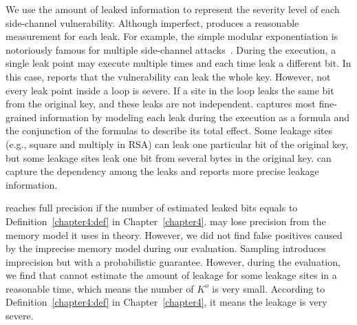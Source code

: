 We use the amount of leaked information to represent the severity level of
each side-channel vulnerability. Although imperfect, \tool{} produces a reasonable
measurement for each leak. For example, the simple modular exponentiation is
notoriously famous for multiple side-channel attacks~\cite{kocher1996timing}.
During the execution, a single leak point may execute multiple times
and each time leak a different bit. In this case, \tool{} reports that the
vulnerability can leak the whole key. However, not every leak point inside a
loop is severe. If a site in the loop leaks the same bit from the
original key, and these leaks are not independent. \tool{} captures most
fine-grained information by modeling each leak during the execution as a
formula and the conjunction of the formulas to describe its total effect.
Some leakage sites (e.g., square and multiply in RSA)
can leak one particular bit of the original key, but some leakage sites leak one bit from several bytes in the original key. \tool{} can capture the dependency among the leaks and reports more precise leakage information.

\tool{} reaches full precision if the number of estimated leaked bits
equals to Definition~\ref{chapter4:def} in Chapter~\ref{chapter4}.
\tool{} may lose precision from the
memory model it uses in theory. However, we did not find false positives
caused by the imprecise memory model during our evaluation.
Sampling introduces imprecision but with a probabilistic guarantee.
However, during the evaluation, we find that \tool{} cannot estimate
the amount of leakage for some leakage sites in a reasonable time,
which means the number of $K^o$ is very small. According to Definition~\ref{chapter4:def} in Chapter~\ref{chapter4}, it means the leakage is very severe. 

